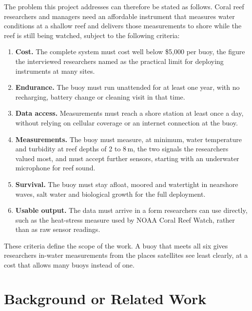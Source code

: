 The problem this project addresses can therefore be stated as follows. Coral reef researchers and managers need an affordable instrument that measures water conditions at a shallow reef and delivers those measurements to shore while the reef is still being watched, subject to the following criteria:
\begin{enumerate}
    \item \textbf{Cost.} The complete system must cost well below \$5{,}000 per buoy, the figure the interviewed researchers named as the practical limit for deploying instruments at many sites.
    \item \textbf{Endurance.} The buoy must run unattended for at least one year, with no recharging, battery change or cleaning visit in that time.
    \item \textbf{Data access.} Measurements must reach a shore station at least once a day, without relying on cellular coverage or an internet connection at the buoy.
    \item \textbf{Measurements.} The buoy must measure, at minimum, water temperature and turbidity at reef depths of 2 to 8\,m, the two signals the researchers valued most, and must accept further sensors, starting with an underwater microphone for reef sound.
    \item \textbf{Survival.} The buoy must stay afloat, moored and watertight in nearshore waves, salt water and biological growth for the full deployment.
    \item \textbf{Usable output.} The data must arrive in a form researchers can use directly, such as the heat-stress measure used by NOAA Coral Reef Watch, rather than as raw sensor readings.
\end{enumerate}
These criteria define the scope of the work. A buoy that meets all six gives researchers in-water measurements from the places satellites see least clearly, at a cost that allows many buoys instead of one.

\section{Background or Related Work} %

